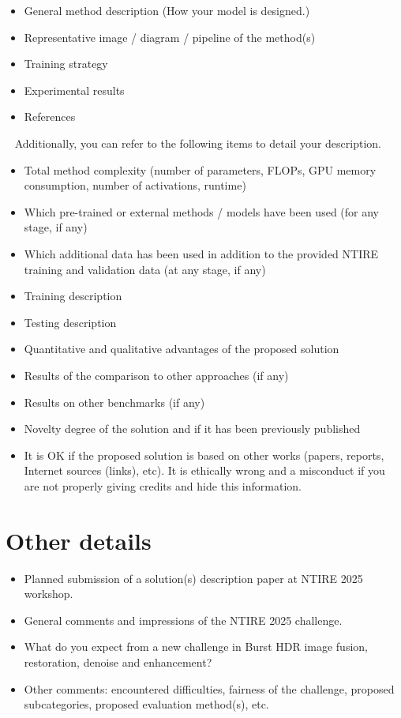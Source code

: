 \documentclass[10pt,twocolumn,letterpaper]{article}
\begin{document}
\begin{itemize}
    \item General method description (How your model is designed.)
    \item Representative image / diagram / pipeline of the method(s)  
    \item Training strategy
    \item Experimental results
    \item References                                               
\end{itemize}
\ \newline
Additionally, you can refer to the following items to detail your description.
\begin{itemize}
    \item Total method complexity (number of parameters, FLOPs, GPU memory consumption, number of activations, runtime)
    \item Which pre-trained or external methods / models have been used (for any stage, if any) 
    \item Which additional data has been used in addition to the provided NTIRE training and validation data (at any stage, if any) 
    \item Training description
    \item Testing description
    \item Quantitative and qualitative advantages of the proposed solution
    \item Results of the comparison to other approaches (if any)
    \item Results on other benchmarks (if any)
    \item Novelty degree of the solution and if it has been previously published
    \item It is OK if the proposed solution is based on other works (papers, reports, Internet sources (links), etc). It is ethically wrong and a misconduct if you are not properly giving credits and hide this information.
\end{itemize}


\section{Other details}
\begin{itemize}
    \item Planned submission of a solution(s) description paper at NTIRE 2025 workshop.
    \item General comments and impressions of the NTIRE 2025 challenge. 
    \item What do you expect from a new challenge in Burst HDR image fusion, restoration, denoise and enhancement?
    \item Other comments: encountered difficulties, fairness of the challenge, proposed subcategories, proposed evaluation method(s), etc.
\end{itemize}

{\small


}
\end{document}
